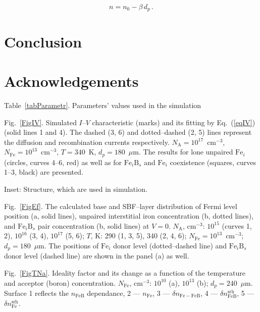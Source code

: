 \documentclass[12pt]{article}
\begin{document}
\begin{equation}
\label{eqN_D}
    n=n_0-\beta\,d_p\,.
\end{equation}

\section{Conclusion}

\section{Acknowledgements}



\newpage

Table~\ref{tabParametr}.
Parameters' values used in the simulation

 Fig.~\ref{FigIV}.
Simulated $I$--$V$ characteristic (marks) and its fitting by Eq.~(\ref{eqIV}) (solid lines 1 and 4).
The dashed (3, 6) and dotted–dashed (2, 5) lines represent the diffusion and recombination currents respectively.
$N_\mathrm{A}=10^{17}$~cm$^{-3}$, $N_\mathrm{Fe}=10^{13}$~cm$^{-3}$, $T=340$~K, $d_p=180$~$\mu$m.
The results for lone unpaired $\mathrm{Fe}_i$ (circles, curves 4--6, red) as well as for $\mathrm{Fe}_i\mathrm{B}_s$ and $\mathrm{Fe}_i$ coexistence
(squares, curves 1--3, black) are presented.

Inset: Structure, which are used in simulation.



 Fig.~\ref{FigEf}.
The calculated base and SBF--layer distribution of Fermi level position (a, solid lines), unpaired interstitial iron concentration (b, dotted lines),
and $\mathrm{Fe}_i\mathrm{B}_s$ pair concentration (b, solid lines) at $V=0$.
$N_\mathrm{A}$, cm$^{-3}$: $10^{15}$ (curves 1, 2), $10^{16}$ (3, 4), $10^{17}$ (5, 6);
$T$, K: 290 (1, 3, 5), 340 (2, 4, 6);
$N_\mathrm{Fe}=10^{13}$~cm$^{-3}$;
$d_p=180$~$\mu$m.
The positions of $\mathrm{Fe}_i$ donor level (dotted--dashed line) and $\mathrm{Fe}_i\mathrm{B}_s$
 donor level (dashed line) are shown in the panel (a) as well.

 Fig.~\ref{FigTNa}.
Ideality factor and its change as a function of the temperature and acceptor (boron) concentration.
$N_\mathrm{Fe}$, cm$^{-3}$: $10^{10}$ (a), $10^{13}$ (b);
$d_p=240$~$\mu$m.
Surface 1 reflects the  $n_\mathrm{FeB}$ dependance,
2 ---  $n_\mathrm{Fe}$,
3 --- $\delta n_\mathrm{Fe-FeB}$,
4 --- $\delta n_\mathrm{FeB}^\mathrm{srh}$,
5 --- $\delta n_\mathrm{Fe}^\mathrm{srh}$.
\end{document}
